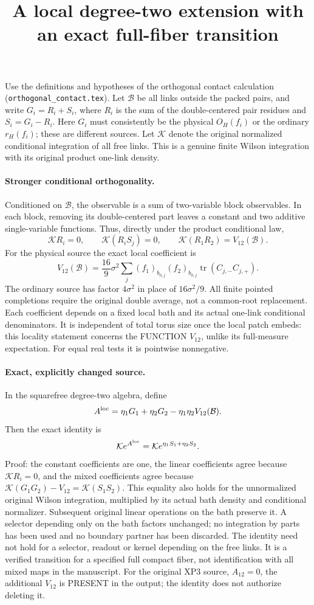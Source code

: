 \documentclass[11pt]{article}
\title{A local degree-two extension with an exact full-fiber transition}\author{}\date{}
\begin{document}
\maketitle
Use the definitions and hypotheses of the orthogonal contact calculation (\texttt{orthogonal\_contact.tex}). Let $\mathcal B$ be
all links outside the packed pairs, and write $G_i=R_i+S_i$, where $R_i$ is the sum
of the double-centered pair residues and $S_i=G_i-R_i$. Here $G_i$ must consistently
be the physical $O_H(f_i)$ or the ordinary $r_H(f_i)$; these are different sources.
Let $\mathcal K$ denote the original normalized conditional integration of all free links.
This is a genuine finite Wilson integration with its original product one-link density.

\paragraph{Stronger conditional orthogonality.}
Conditioned on $\mathcal B$, the observable is a sum of two-variable block observables.
In each block, removing its double-centered part leaves a constant and two additive
single-variable functions. Thus, directly under the product conditional law,
\[
 \mathcal K R_i=0,\qquad \mathcal K(R_iS_j)=0,\qquad
 \mathcal K(R_1R_2)=V_{12}(\mathcal B).
\]
For the physical source the exact local coefficient is
\[
 V_{12}(\mathcal B)=\frac{16}{9}\sigma^2
 \sum_{j} (f_1)_{b_{0,j}}(f_2)_{b_{0,j}}\operatorname{tr}(C_{j,-}C_{j,+}).
\]
The ordinary source has factor $4\sigma^2$ in place of $16\sigma^2/9$.
All finite pointed completions require the original double average, not a common-root
replacement. Each coefficient depends on a fixed local bath and its actual one-link
conditional denominators. It is independent of total torus size once the local patch embeds:
this locality statement concerns the FUNCTION $V_{12}$, unlike its full-measure expectation.
For equal real tests it is pointwise nonnegative.

\paragraph{Exact, explicitly changed source.}
In the squarefree degree-two algebra, define
\[
 A^{\rm loc}=\eta_1G_1+\eta_2G_2-\eta_1\eta_2V_{12}(\mathcal B).
\]
Then the exact identity is
\[
 \mathcal K e^{A^{\rm loc}}=\mathcal K e^{\eta_1S_1+\eta_2S_2}.
\]
Proof: the constant coefficients are one, the linear coefficients agree because
$\mathcal K R_i=0$, and the mixed coefficients agree because
$\mathcal K(G_1G_2)-V_{12}=\mathcal K(S_1S_2)$.
This equality also holds for the unnormalized original Wilson integration, multiplied by
its actual bath density and conditional normalizer. Subsequent original linear operations
on the bath preserve it. A selector depending only on the bath factors unchanged; no
integration by parts has been used and no boundary partner has been discarded.
The identity need not hold for a selector, readout or kernel depending on the free links.
It is a verified transition for a specified full compact fiber, not identification with all
mixed maps in the manuscript. For the original XP3 source, $A_{12}=0$, the additional
$V_{12}$ is PRESENT in the output; the identity does not authorize deleting it.
\end{document}
